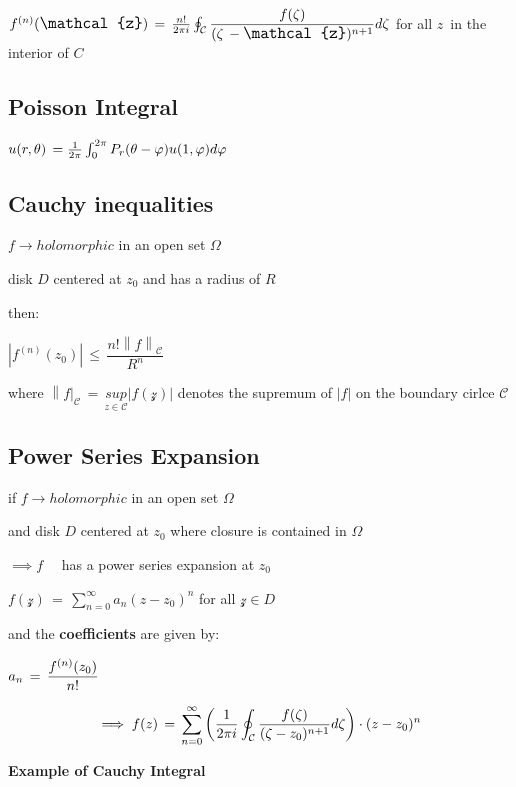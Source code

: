 \documentclass[11pt]{article}
\begin{document}
\(\large f^{(n)}(\mathcal{z})\,=\,\frac{n!}{2\pi i}\oint_{\mathcal{C}}{\dfrac{f(\zeta)}{(\zeta\,-\mathcal{z})^{n+1}}d\zeta}\)
for all \(z\,\) in the interior of \(C\)

    \subsection{Poisson Integral}\label{poisson-integral}

\(\large u(r,\theta)\,=\frac{1}{2\pi}\int_{0}^{2\pi}{P_{r}(\theta-\varphi)u(1,\varphi)d\varphi}\)

    \subsection{Cauchy inequalities}\label{cauchy-inequalities}

\(f\longrightarrow holomorphic\) in an open set \(\Omega\)

disk \(D\) centered at \(z_{0}\) and has a radius of \(R\)

then:

\(\left|f^{(n)}(z_{0}) \right| \, \le \, \dfrac{n!\left\|f\right\|_{\mathcal{C}}}{R^{n}}\)

where
\(\left\|f\right|_{\mathcal{C}}\,=\,\underset{z\in \mathcal{C}}{sup}|f(\mathcal{z})|\)
denotes the supremum of \(|f|\) on the boundary cirlce \(\mathcal{C}\)

    \subsection{Power Series Expansion}\label{power-series-expansion}

if \(f \longrightarrow holomorphic\) in an open set \(\Omega\)

and disk \(D\) centered at \(z_{0}\) where closure is contained in
\(\Omega\)

\(\implies f\quad\) has a power series expansion at \(z_{0}\)

\(f(\mathcal{z})\,=\,\sum_{n=0}^{\infty}{a_{n}(z-z_{0})^{n}}\) for all
\(\mathcal{z} \in D\)

and the \textbf{coefficients} are given by:

\(\large a_{n}\,=\,\dfrac{f^{(n)}(z_{0})}{n!}\)

\[\Large \implies f(z)\,=\,\sum_{n=0}^{\infty}{\left(\frac{1}{2\pi i}\oint_{\mathcal{C}}{\dfrac{f(\zeta)}{(\zeta-z_{0})^{n+1}}d\zeta}\right)\cdot(z-z_{0})^{n}}\]

    \textbf{Example of Cauchy Integral}
\end{document}
